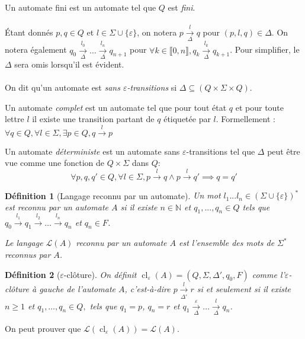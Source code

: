 \documentclass[10pt,a4paper]{article}
\newtheorem{mydef}{D\'efinition}
\newcommand{\enum}[2]{\llbracket #1, #2 \rrbracket}
\begin{document}
Un automate fini est un automate tel que $Q$ est \emph{fini}.
\paragraph{}
\'Etant donn\'es $p,q \in Q$ et $l\in \Sigma \cup \{\varepsilon\}$, on notera $p \underset{\Delta}{\overset{l}{{\to}}}q$ pour $(p,l,q) \in \Delta$. On notera \'egalement $q_0 \underset{\Delta}{\overset{l_0}{{\to}}} \dots \underset{\Delta}{\overset{l_n}{{\to}}} q_{n+1}$ pour $\forall k \in \enum{0}{n}, q_k 
\underset{\Delta}{\overset{l_k}{{\to}}} q_{k+1}$. Pour simplifier, le $\Delta$ sera omis lorsqu'il est \'evident.
\paragraph{}
On dit qu'un automate est \emph{sans $\varepsilon$-transitions} si $\Delta \subseteq (Q\times \Sigma \times Q)$.

Un automate \emph{complet} est un automate tel que pour tout \'etat $q$ et pour toute lettre $l$ il existe une transition partant de $q$ \'etiquet\'ee par $l$. Formellement : $\forall q \in Q, \forall l \in \Sigma, \exists p\in Q, q\overset{l}{\to}p$

Un automate \emph{d\'eterministe} est un automate sans $\varepsilon$-transitions tel que $\Delta$ peut \^etre vue comme une fonction de $Q\times \Sigma$ dans $Q$: $$\forall p,q,q' \in Q, \forall l \in \Sigma, p\overset{l}{{\to}}q \land p\overset{l}{{\to}}q' \implies q=q'$$

\begin{mydef}[Langage reconnu par un automate]
Un mot $l_1...l_n \in \left(\Sigma\cup \{\varepsilon\}\right)^*$ est reconnu par un automate $A$ si il existe $n \in \mathbb N$ et $q_1,...,q_n \in Q$ tels que $q_0 \overset{l_1}{{\to}} q_1 \overset{l_2}{{\to}} \dots \overset{l_n}{{\to}} q_{n}$ et $q_{n} \in F$.

Le langage $\mathcal{L}(A)$ reconnu par un automate $A$ est l'ensemble des mots de $\Sigma^*$ reconnus par $A$.
\end{mydef}

\begin{mydef}[$\varepsilon$-clôture]
On définit  $\operatorname{cl}_\varepsilon(A) = (Q, \Sigma, \Delta', q_0, F)$ comme l'$\varepsilon$-clôture \`a gauche de l'automate $A$, c'est-\`a-dire $p \underset{\Delta'}{\overset{l}{{\to}}} r$ si et seulement si il existe $n\ge 1$ et $q_1,\dots,q_n \in Q,$ tels que $q_1 = p$, $q_n = r$ et $q_1 \underset{\Delta}{\overset{\varepsilon}{{\to}}} \dots \underset{\Delta}{\overset{l}{{\to}}} q_n$.
\end{mydef}
On peut prouver que $\mathcal L(\operatorname{cl}_\varepsilon(A))=\mathcal L(A)$.
\end{document}
